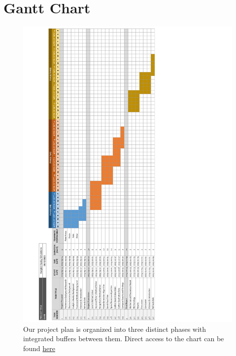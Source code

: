 \documentclass{article} %
\begin{document}
\section{Gantt Chart}
\label{app:a_gantt_chart}
\begin{figure}[htbp]
  \centering
  \includegraphics[width=0.88\linewidth]{Figs/gantt_chart_rot.png}
    \caption{Our project plan is organized into three distinct phases with integrated buffers between them.
            Direct access to the chart can be found \href{https://docs.google.com/spreadsheets/d/1jHzTcHqw4nSWZ5ZlPa9hzeYbwHf0eZ49koE-SQ0onvM/edit?usp=sharing}{here}}
\end{figure}
\end{document}
